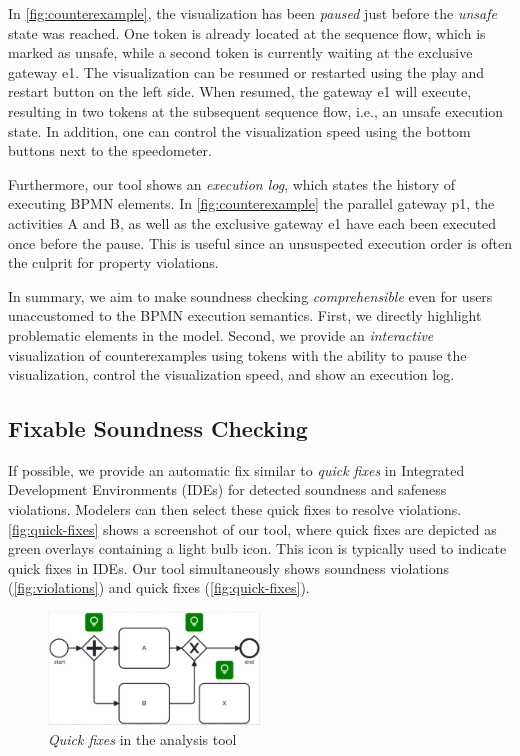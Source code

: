 \documentclass[runningheads]{llncs}
\begin{document}
In \autoref{fig:counterexample}, the visualization has been \textit{paused} just before the \textit{unsafe} state was reached.
One token is already located at the sequence flow, which is marked as unsafe, while a second token is currently waiting at the exclusive gateway \textsf{e1}.
The visualization can be resumed or restarted using the play and restart button on the left side.
When resumed, the gateway \textsf{e1} will execute, resulting in two tokens at the subsequent sequence flow, i.e., an unsafe execution state.
In addition, one can control the visualization speed using the bottom buttons next to the speedometer.

Furthermore, our tool shows an \textit{execution log}, which states the history of executing BPMN elements.
In \autoref{fig:counterexample} the parallel gateway \textsf{p1}, the activities \textsf{A} and \textsf{B}, as well as the exclusive gateway \textsf{e1} have each been executed once before the pause.
This is useful since an unsuspected execution order is often the culprit for property violations.

In summary, we aim to make soundness checking \textit{comprehensible} even for users unaccustomed to the BPMN execution semantics.
First, we directly highlight problematic elements in the model.
Second, we provide an \textit{interactive} visualization of counterexamples using tokens with the ability to pause the visualization, control the visualization speed, and show an execution log.

\subsection{Fixable Soundness Checking} \label{subsec:fixable-checking}

If possible, we provide an automatic fix similar to \textit{quick fixes} in Integrated Development Environments (IDEs) for detected soundness and safeness violations.
Modelers can then select these quick fixes to resolve violations.
\autoref{fig:quick-fixes} shows a screenshot of our tool, where quick fixes are depicted as green overlays containing a light bulb icon.
This icon is typically used to indicate quick fixes in IDEs.
Our tool simultaneously shows soundness violations (\autoref{fig:violations}) and quick fixes (\autoref{fig:quick-fixes}).

\begin{figure}[ht]
	\centering
	\includegraphics[width=0.5\textwidth]{images/quickfixes}
	\caption{\textit{Quick fixes} in the analysis tool}
	\label{fig:quick-fixes}
\end{figure}
\end{document}
